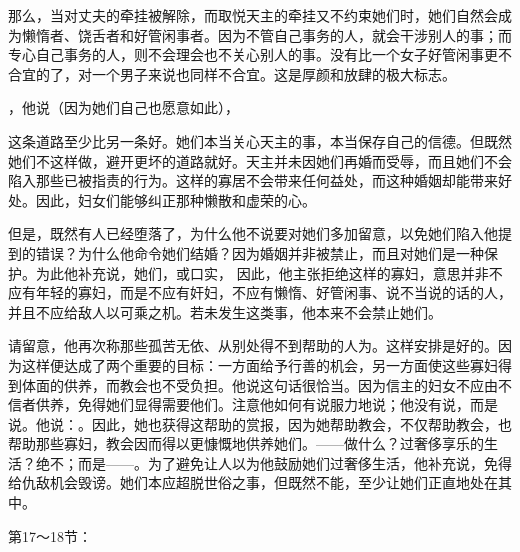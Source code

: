 那么，当对丈夫的牵挂被解除，而取悦天主的牵挂又不约束她们时，她们自然会成为懒惰者、饶舌者和好管闲事者。因为不管自己事务的人，就会干涉别人的事；而专心自己事务的人，则不会理会也不关心别人的事。没有比一个女子好管闲事更不合宜的了，对一个男子来说也同样不合宜。这是厚颜和放肆的极大标志。\par

，他说（因为她们自己也愿意如此），\par

这条道路至少比另一条好。她们本当关心天主的事，本当保存自己的信德。但既然她们不这样做，避开更坏的道路就好。天主并未因她们再婚而受辱，而且她们不会陷入那些已被指责的行为。这样的寡居不会带来任何益处，而这种婚姻却能带来好处。因此，妇女们能够纠正那种懒散和虚荣的心。\par

但是，既然有人已经堕落了，为什么他不说要对她们多加留意，以免她们陷入他提到的错误？为什么他命令她们结婚？因为婚姻并非被禁止，而且对她们是一种保护。为此他补充说，她们，或口实， 因此，他主张拒绝这样的寡妇，意思并非不应有年轻的寡妇，而是不应有奸妇，不应有懒惰、好管闲事、说不当说的话的人，并且不应给敌人以可乘之机。若未发生这类事，他本来不会禁止她们。\par

 \par

请留意，他再次称那些孤苦无依、从别处得不到帮助的人为。这样安排是好的。因为这样便达成了两个重要的目标：一方面给予行善的机会，另一方面使这些寡妇得到体面的供养，而教会也不受负担。他说这句话很恰当。因为信主的妇女不应由不信者供养，免得她们显得需要他们。注意他如何有说服力地说；他没有说，而是说。他说：。因此，她也获得这帮助的赏报，因为她帮助教会，不仅帮助教会，也帮助那些寡妇，教会因而得以更慷慨地供养她们。——做什么？过奢侈享乐的生活？绝不；而是——。为了避免让人以为他鼓励她们过奢侈生活，他补充说，免得给仇敌机会毁谤。她们本应超脱世俗之事，但既然不能，至少让她们正直地处在其中。\par

第17～18节：\par

